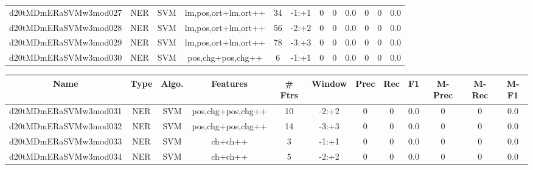 \documentclass[a4paper]{article}
\begin{document}
\begin{landscape}
\begin{center}
\begin{tabular}{ |c|c|c|c|c|c|c|c|c|c|c|c|}
 
 	
 	\small{ d20tMDmERaSVMw3mod027 } & \small{ NER} & \small{  SVM }  & lm,pos,ort+lm,ort++  &  34 &  \small{  -1:+1 }  &  0 & 0 & 0.0  &  0 & 0 & 0.0 \\
 	

 
 	
 	\small{ d20tMDmERaSVMw3mod028 } & \small{ NER} & \small{  SVM }  & lm,pos,ort+lm,ort++  &  56 &  \small{  -2:+2 }  &  0 & 0 & 0.0  &  0 & 0 & 0.0 \\
 	

 
 	
 	\small{ d20tMDmERaSVMw3mod029 } & \small{ NER} & \small{  SVM }  & lm,pos,ort+lm,ort++  &  78 &  \small{  -3:+3 }  &  0 & 0 & 0.0  &  0 & 0 & 0.0 \\
 	

 
 	
 	\small{ d20tMDmERaSVMw3mod030 } & \small{ NER} & \small{  SVM }  & pos,chg+pos,chg++  &  6 &  \small{  -1:+1 }  &  0 & 0 & 0.0  &  0 & 0 & 0.0 \\
 	
 \hline
\end{tabular}
\end{center}




\begin{center}
\begin{tabular}{ |c|c|c|c|c|c|c|c|c|c|c|c|} 
 \hline
 	Name & Type & Algo. & Features & \# Ftrs & Window & Prec & Rec & F1 & M-Prec & M-Rec & M-F1\\
 \hline

 	

 
 	
 	\small{ d20tMDmERaSVMw3mod031 } & \small{ NER} & \small{  SVM }  & pos,chg+pos,chg++  &  10 &  \small{  -2:+2 }  &  0 & 0 & 0.0  &  0 & 0 & 0.0 \\
 	

 
 	
 	\small{ d20tMDmERaSVMw3mod032 } & \small{ NER} & \small{  SVM }  & pos,chg+pos,chg++  &  14 &  \small{  -3:+3 }  &  0 & 0 & 0.0  &  0 & 0 & 0.0 \\
 	

 
 	
 	\small{ d20tMDmERaSVMw3mod033 } & \small{ NER} & \small{  SVM }  & ch+ch++  &  3 &  \small{  -1:+1 }  &  0 & 0 & 0.0  &  0 & 0 & 0.0 \\
 	

 
 	
 	\small{ d20tMDmERaSVMw3mod034 } & \small{ NER} & \small{  SVM }  & ch+ch++  &  5 &  \small{  -2:+2 }  &  0 & 0 & 0.0  &  0 & 0 & 0.0 \\
 	


\end{tabular}
\end{center}
\end{landscape}
\end{document}
